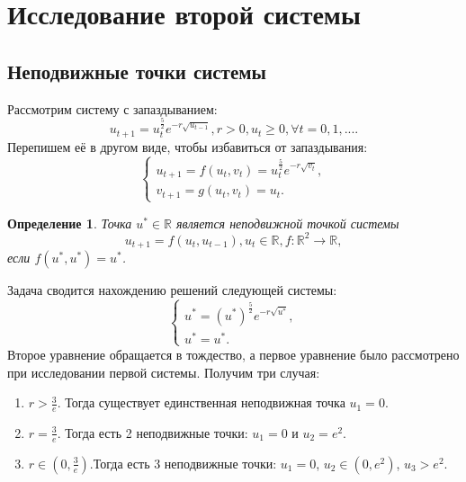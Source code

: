 \documentclass[12pt]{article}
\newtheorem{definition}{Определение}
\begin{document}
\newpage
\section{Исследование второй системы}
\subsection{Неподвижные точки системы}
Рассмотрим систему с запаздыванием:
$$
    u_{t+1} = u_t^{\frac{5}{2}}e^{-r\sqrt{u_{t-1}}}, r > 0, u_t \geqslant 0, \forall t = 0, 1, ....
$$
Перепишем её в другом виде, чтобы избавиться от запаздывания:
\begin{equation}
    \begin{cases}
        u_{t+1} = f(u_t, v_t) = u_t^{\frac{5}{2}}e^{-r\sqrt{v_t}}, \\
        v_{t+1} = g(u_t, v_t) = u_t. \label{cs1}
    \end{cases}
\end{equation}
\begin{definition}
    Точка $u^* \in \mathbb{R}$ является \textit{неподвижной точкой} системы
    $$
        u_{t+1} = f(u_t, u_{t-1}), u_t \in \mathbb{R}, f: \mathbb{R}^2 \rightarrow \mathbb{R},
    $$
    если $f(u^*, u^*) = u^*$.
\end{definition}
Задача сводится нахождению решений следующей системы:
\begin{equation}
    \begin{cases}
        u^* = (u^*)^{\frac{5}{2}}e^{-r\sqrt{u^*}}, \\
        u^* = u^*.
    \end{cases}
\end{equation}
Второе уравнение обращается в тождество, а первое уравнение было рассмотрено при исследовании первой системы. Получим три случая:
\begin{enumerate}
    \item $r > \frac{3}{e}$. Тогда существует единственная неподвижная точка $u_1 = 0$.
    \item $r = \frac{3}{e}$. Тогда есть 2 неподвижные точки: $u_1 = 0$ и $u_2 = e^2$.
    \item $r \in \left(0, \frac{3}{e}\right)$.Тогда есть 3 неподвижные точки: $u_1 = 0$, $u_2 \in (0, e^2)$, $u_3 > e^2$.
\end{enumerate}

\newpage
\end{document}
